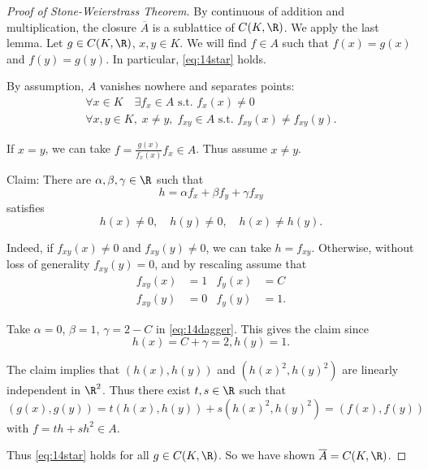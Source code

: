 \documentclass{article}
\begin{document}
\begin{proof}[Proof of Stone-Weierstrass Theorem]
    By continuous of addition and multiplication, the closure $\overline{A}$ is a sublattice of $C(K, \R)$.
    We apply the last lemma.
    Let $g \in C(K, \R)$, $x, y \in K$. We will find $f \in A$ such that $f(x) = g(x)$ and $f(y) = g(y)$.
    In particular, \eqref{eq:14star} holds.

    By assumption, $A$ vanishes nowhere and separates points:
    \begin{gather*}
        \forall x \in K \quad \exists f_x \in A \text{ s.t. } f_x(x) \neq 0 \\
        \forall x, y \in K, \; x \neq y, \; f_{xy} \in A \text{ s.t. } f_{xy}(x) \neq f_{xy}(y).
    \end{gather*}

    If $x = y$, we can take $f = \frac{g(x)}{f_x(x)} f_x \in A$.
    Thus assume $x \neq y$.

    Claim: There are $\alpha, \beta, \gamma \in \R$ such that
    \begin{equation*}
        h = \alpha f_x + \beta f_y + \gamma f_{xy} \label{eq:14dagger} \tag{$\dagger$}
    \end{equation*}
    satisfies
    \begin{equation*}
        h(x) \neq 0, \quad h(y) \neq 0, \quad h(x) \neq h(y).
    \end{equation*}

    Indeed, if $f_{xy}(x) \neq 0$ and $f_{xy}(y) \neq 0$, we can take $h = f_{xy}$.
    Otherwise, without loss of generality $f_{xy}(y) = 0$, and by rescaling assume that
    \begin{align*}
        f_{xy}(x) &= 1 & f_y(x) &= C \\
        f_{xy}(y) &= 0 & f_y(y) &= 1.
    \end{align*}

    Take $\alpha = 0$, $\beta=1$, $\gamma=2-C$ in \eqref{eq:14dagger}.
    This gives the claim since
    \begin{equation*}
        h(x) = C + \gamma = 2, h(y) = 1.
    \end{equation*}

    The claim implies that $(h(x), h(y))$ and $(h(x)^2, h(y)^2)$ are linearly independent in $\R^2$.
    Thus there exist $t, s \in \R$ such that
    \begin{equation*}
        (g(x), g(y)) = t(h(x), h(y)) + s(h(x)^2, h(y)^2) = (f(x), f(y))
    \end{equation*}
    with $f = th + sh^2 \in A$.

    Thus \eqref{eq:14star} holds for all $g \in C(K, \R)$.
    So we have shown $\overline{A} = C(K, \R)$.
\end{proof}
\end{document}
